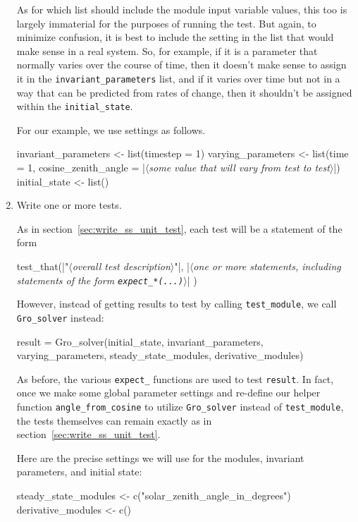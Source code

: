 \documentclass{article}\usepackage[]{graphicx}\usepackage[]{color}
\newcommand{\Rcode}[1]{\lstinline[style=Rstyle]{#1}}
\newcommand{\placeholder}[1]{$\langle$\textrm{\textit{#1}}$\rangle$}
\newcommand{\stringplaceholder}[1]{{\color{stringcolor}"$\langle$\textrm{\textit{#1}}$\rangle$"}}
\begin{document}
\begin{appendices}
\begin{enumerate}
  As for which list should include the module input variable values,
  this too is largely immaterial for the purposes of running the test.
  But again, to minimize confusion, it is best to include the setting
  in the list that would make sense in a real system.  So, for
  example, if it is a parameter that normally varies over the course
  of time, then it doesn't make sense to assign it in the
  \Rcode{invariant_parameters} list, and if it varies over time but
  not in a way that can be predicted from rates of change, then it
  shouldn't be assigned within the \Rcode{initial_state}.

  For our example, we use settings as follows.

  \begin{Rexample}[4]
    invariant_parameters <- list(timestep = 1)
    varying_parameters <- list(time = 1,
                               cosine_zenith_angle = |\placeholder{some value that will vary from test to test}|)
    initial_state <- list()
  \end{Rexample}

\item Write one or more tests.

  As in section~\ref{sec:write_ss_unit_test}, each test will be a
  statement of the form
    \begin{Rlisting}[4]
    test_that(|\stringplaceholder{overall test description}|, {
      |\placeholder{one or more statements, including statements of the form \texttt{expect\_*(...)}}|
    })
  \end{Rlisting}
  However, instead of getting results to test by calling
  \Rcode{test_module}, we call \Rcode{Gro_solver} instead:
  \begin{Rlisting}[4]
    result = Gro_solver(initial_state, invariant_parameters, varying_parameters, steady_state_modules, derivative_modules)
  \end{Rlisting}

As before, the various \Rcode{expect_} functions are used to test
\Rcode{result}.  In fact, once we make some global parameter settings
and re-define our helper function \Rcode{angle_from_cosine} to utilize
\Rcode{Gro_solver} instead of \Rcode{test_module}, the tests
themselves can remain exactly as in section~\ref{sec:write_ss_unit_test}.

Here are the precise settings we will use for the modules, invariant
parameters, and initial state:

    \begin{Rexample}[6]
      steady_state_modules <- c("solar_zenith_angle_in_degrees")
      derivative_modules <- c()


\end{Rexample}
\end{enumerate}
\end{appendices}
\end{document}
